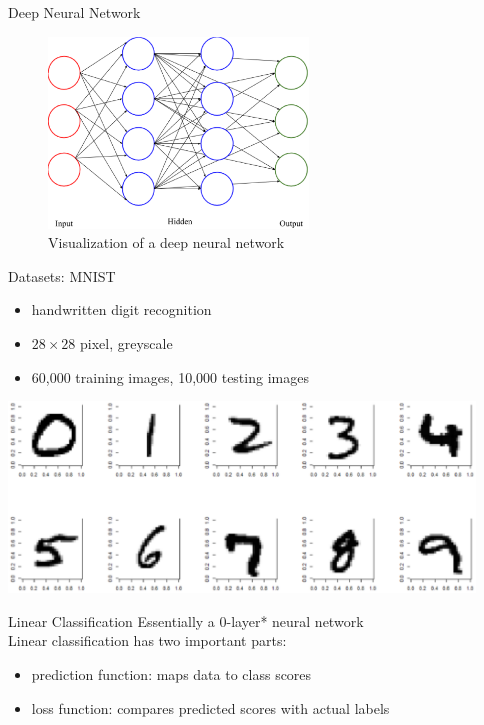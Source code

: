 \documentclass{beamer}
\begin{document}
  \begin{frame}{Deep Neural Network}
    \begin{figure}[ht!]
      \centering
      \includegraphics[height=2in]{../figures/deep_nn.eps}
      \caption{Visualization of a deep neural network}
      \label{fig:dnn}
    \end{figure}
  \end{frame}

  \begin{frame}{Datasets: MNIST}
    \begin{itemize}
      \item handwritten digit recognition
      \item $28 \times 28$ pixel, greyscale
      \item 60,000 training images, 10,000 testing images
    \end{itemize}
    \begin{center}
      \includegraphics[height=2in]{../figures/mnist.eps}
    \end{center}
  \end{frame}

  \begin{frame}{Linear Classification}
    Essentially a 0-layer* neural network\\
    Linear classification has two important parts:
    \begin{itemize}
      \item prediction function: maps data to class scores
      \item loss function: compares predicted scores with actual labels
    \end{itemize}
  \end{frame}
\end{document}
